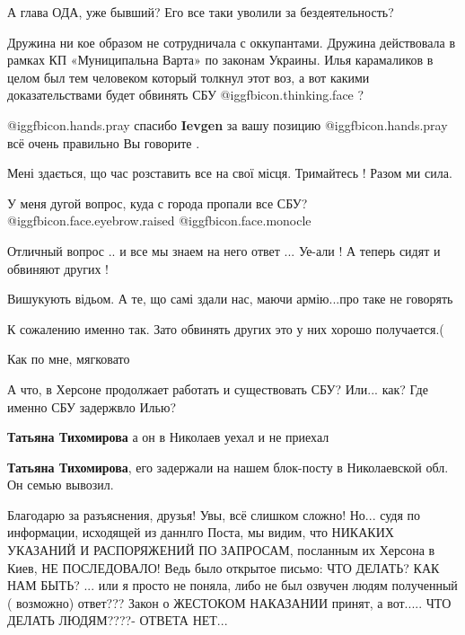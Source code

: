 \begin{itemize}
А глава ОДА, уже бывший? Его все таки уволили за бездеятельность?


Дружина ни кое образом не сотрудничала с оккупантами. Дружина действовала в
рамках КП «Муниципальна Варта» по законам Украины. Илья карамаликов в целом был
тем человеком который толкнул этот воз, а вот какими доказательствами будет
обвинять СБУ  @igg{fbicon.thinking.face} ?

 @igg{fbicon.hands.pray} спасибо \textbf{Ievgen} за вашу позицию  @igg{fbicon.hands.pray}  всё очень правильно Вы говорите .

Мені здається, що час розставить все на свої місця.
Тримайтесь !
Разом ми сила.

У меня дугой вопрос, куда с города пропали все СБУ?  @igg{fbicon.face.eyebrow.raised}  @igg{fbicon.face.monocle} 

Отличный вопрос .. и все мы знаем на него ответ ... Уе-али ! А теперь сидят и обвиняют других !

Вишукують відьом. А те, що самі здали нас, маючи армію...про таке не говорять

К сожалению именно так. Зато обвинять других это у них хорошо получается.(

Как по мне, мягковато

А что, в Херсоне продолжает работать и существовать СБУ? Или... как? Где именно СБУ задержвло Илью?

\begin{itemize} %
\textbf{Татьяна Тихомирова} а он в Николаев уехал и не приехал

\textbf{Татьяна Тихомирова}, его задержали на нашем блок-посту в Николаевской обл. Он семью вывозил.


Благодарю за разъяснения, друзья! Увы, всё слишком сложно! Но... судя по
информации, исходящей из даннлго Поста, мы видим, что НИКАКИХ УКАЗАНИЙ И
РАСПОРЯЖЕНИЙ ПО ЗАПРОСАМ, посланным их Херсона в Киев, НЕ ПОСЛЕДОВАЛО! Ведь
было открытое письмо: ЧТО ДЕЛАТЬ? КАК НАМ БЫТЬ? ... или я просто не поняла,
либо не был озвучен людям полученный ( возможно) ответ??? Закон о ЖЕСТОКОМ
НАКАЗАНИИ принят, а вот..... ЧТО ДЕЛАТЬ ЛЮДЯМ????- ОТВЕТА НЕТ...


\end{itemize}
\end{itemize}
